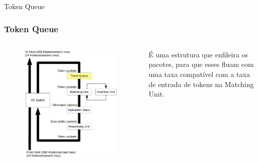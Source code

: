 \documentclass{beamer}
\begin{document}
\begin{frame}{Token Queue}
	\subsubsection{Token Queue}
	\begin{columns}
		\column{6cm}
			\begin{figure}
				\centering
				\includegraphics[width=\textwidth]{TokenQueue}
			\end{figure}

			É uma estrutura que enfileira os pacotes, para que esses fluam com uma taxa compatível com a taxa de entrada de tokens na Matching Unit.
	\end{columns}
\end{frame}
\end{document}

